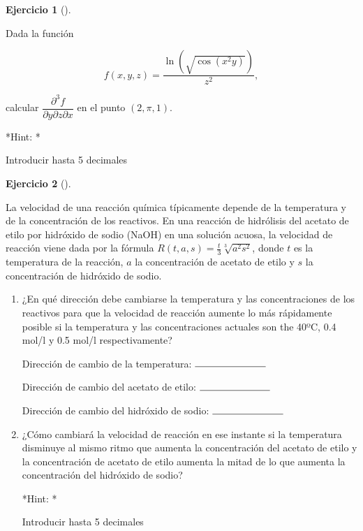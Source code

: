 \documentclass[
  a4paper,
]{scrreport}
\theoremstyle{definition}
\newtheorem{exercise}{Ejercicio}[chapter]
\theoremstyle{remark}
\begin{document}
\begin{exercise}[]\protect\hypertarget{exr-derivadas-funciones-varias-variables-propuesto-2}{}\label{exr-derivadas-funciones-varias-variables-propuesto-2}

Dada la función

\[
f(x,y,z)=\frac{\ln(\sqrt{\cos(x^2y)})}{z^2},
\]

calcular \(\dfrac{\partial^3 f}{\partial y\partial z\partial x}\) en el
punto \((2,\pi,1)\).

\vspace{18pt}*Hint: *

Introducir hasta 5 decimales

\end{exercise}

\begin{exercise}[]\protect\hypertarget{exr-derivadas-funciones-varias-variables-propuesto-3}{}\label{exr-derivadas-funciones-varias-variables-propuesto-3}

La velocidad de una reacción química típicamente depende de la
temperatura y de la concentración de los reactivos. En una reacción de
hidrólisis del acetato de etilo por hidróxido de sodio (NaOH) en una
solución acuosa, la velocidad de reacción viene dada por la fórmula
\(R(t,a,s)=\frac{t}{3}\sqrt[3]{a^2s^2}\), donde \(t\) es la temperatura
de la reacción, \(a\) la concentración de acetato de etilo y \(s\) la
concentración de hidróxido de sodio.

\begin{enumerate}
\def\labelenumi{\alph{enumi}.}
\item
  ¿En qué dirección debe cambiarse la temperatura y las concentraciones
  de los reactivos para que la velocidad de reacción aumente lo más
  rápidamente posible si la temperatura y las concentraciones actuales
  son the 40ºC, 0.4 mol/l y 0.5 mol/l respectivamente?

  Dirección de cambio de la temperatura: $\rule{2.54cm}{0.15mm}$

  Dirección de cambio del acetato de etilo: $\rule{2.54cm}{0.15mm}$

  Dirección de cambio del hidróxido de sodio: $\rule{2.54cm}{0.15mm}$
\item
  ¿Cómo cambiará la velocidad de reacción en ese instante si la
  temperatura disminuye al mismo ritmo que aumenta la concentración del
  acetato de etilo y la concentración de acetato de etilo aumenta la
  mitad de lo que aumenta la concentración del hidróxido de sodio?

  \vspace{18pt}*Hint: *

  Introducir hasta 5 decimales
\end{enumerate}

\end{exercise}
\end{document}
